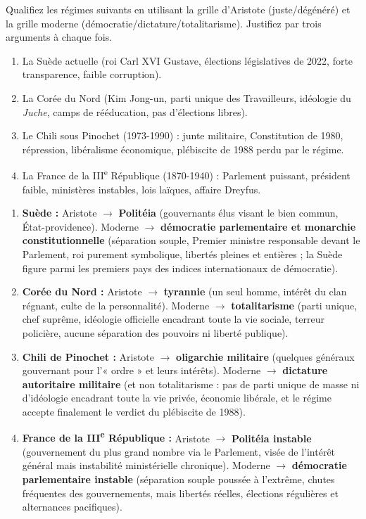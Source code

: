 \documentclass[11pt]{article}
\begin{document}
\begin{exercice}
Qualifiez les régimes suivants en utilisant la grille d'Aristote (juste/dégénéré) et la grille moderne (démocratie/dictature/totalitarisme). Justifiez par trois arguments à chaque fois.
\begin{enumerate}
\item La Suède actuelle (roi Carl XVI Gustave, élections législatives de 2022, forte transparence, faible corruption).
\item La Corée du Nord (Kim Jong-un, parti unique des Travailleurs, idéologie du \emph{Juche}, camps de rééducation, pas d'élections libres).
\item Le Chili sous Pinochet (1973-1990) : junte militaire, Constitution de 1980, répression, libéralisme économique, plébiscite de 1988 perdu par le régime.
\item La France de la III\textsuperscript{e} République (1870-1940) : Parlement puissant, président faible, ministères instables, lois laïques, affaire Dreyfus.
\end{enumerate}
\end{exercice}

\begin{corrige}
\begin{enumerate}
\item \textbf{Suède :} Aristote $\to$ \textbf{Politéia} (gouvernants élus visant le bien commun, État-providence). Moderne $\to$ \textbf{démocratie parlementaire et monarchie constitutionnelle} (séparation souple, Premier ministre responsable devant le Parlement, roi purement symbolique, libertés pleines et entières ; la Suède figure parmi les premiers pays des indices internationaux de démocratie).
\item \textbf{Corée du Nord :} Aristote $\to$ \textbf{tyrannie} (un seul homme, intérêt du clan régnant, culte de la personnalité). Moderne $\to$ \textbf{totalitarisme} (parti unique, chef suprême, idéologie officielle encadrant toute la vie sociale, terreur policière, aucune séparation des pouvoirs ni liberté publique).
\item \textbf{Chili de Pinochet :} Aristote $\to$ \textbf{oligarchie militaire} (quelques généraux gouvernant pour l'« ordre » et leurs intérêts). Moderne $\to$ \textbf{dictature autoritaire militaire} (et non totalitarisme : pas de parti unique de masse ni d'idéologie encadrant toute la vie privée, économie libérale, et le régime accepte finalement le verdict du plébiscite de 1988).
\item \textbf{France de la III\textsuperscript{e} République :} Aristote $\to$ \textbf{Politéia instable} (gouvernement du plus grand nombre via le Parlement, visée de l'intérêt général mais instabilité ministérielle chronique). Moderne $\to$ \textbf{démocratie parlementaire instable} (séparation souple poussée à l'extrême, chutes fréquentes des gouvernements, mais libertés réelles, élections régulières et alternances pacifiques).
\end{enumerate}
\end{corrige}
\end{document}
